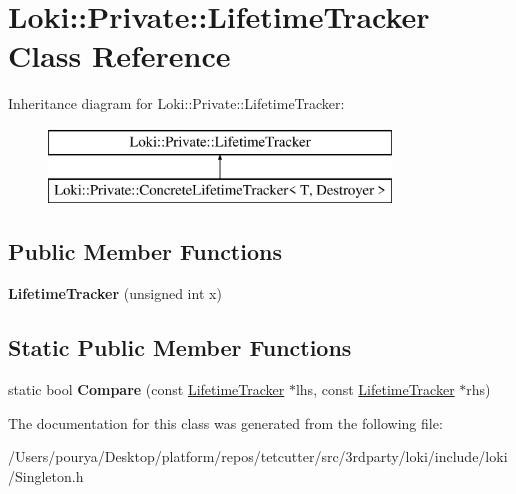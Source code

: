 \hypertarget{classLoki_1_1Private_1_1LifetimeTracker}{}\section{Loki\+:\+:Private\+:\+:Lifetime\+Tracker Class Reference}
\label{classLoki_1_1Private_1_1LifetimeTracker}
Inheritance diagram for Loki\+:\+:Private\+:\+:Lifetime\+Tracker\+:\begin{figure}[H]
\begin{center}
\leavevmode
\includegraphics[height=2.000000cm]{classLoki_1_1Private_1_1LifetimeTracker}
\end{center}
\end{figure}
\subsection*{Public Member Functions}
\begin{DoxyCompactItemize}
\item 
\hypertarget{classLoki_1_1Private_1_1LifetimeTracker_a0b3f818b03181590f26561439e914192}{}{\bfseries Lifetime\+Tracker} (unsigned int x)\label{classLoki_1_1Private_1_1LifetimeTracker_a0b3f818b03181590f26561439e914192}

\end{DoxyCompactItemize}
\subsection*{Static Public Member Functions}
\begin{DoxyCompactItemize}
\item 
\hypertarget{classLoki_1_1Private_1_1LifetimeTracker_a79e92af2d5db87e061e5d5f6afdfc330}{}static bool {\bfseries Compare} (const \hyperlink{classLoki_1_1Private_1_1LifetimeTracker}{Lifetime\+Tracker} $\ast$lhs, const \hyperlink{classLoki_1_1Private_1_1LifetimeTracker}{Lifetime\+Tracker} $\ast$rhs)\label{classLoki_1_1Private_1_1LifetimeTracker_a79e92af2d5db87e061e5d5f6afdfc330}

\end{DoxyCompactItemize}


The documentation for this class was generated from the following file\+:\begin{DoxyCompactItemize}
\item 
/\+Users/pourya/\+Desktop/platform/repos/tetcutter/src/3rdparty/loki/include/loki/Singleton.\+h\end{DoxyCompactItemize}
